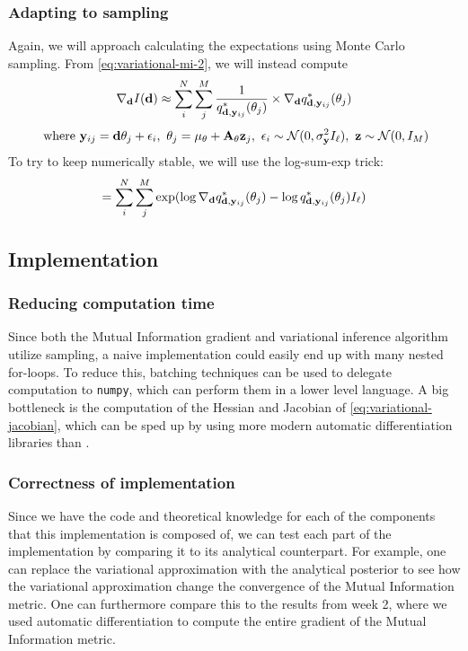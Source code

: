 \subsubsection{Adapting to sampling}
Again, we will approach calculating the expectations using Monte Carlo sampling. From \eqref{eq:variational-mi-2}, we will instead compute
\begin{equation}\nabla_{\mathbf{d}} I(\mathbf{d}) \approx \sum_{i}^N \sum_{j}^M \frac{1}{q^*_{\mathbf{d}, \mathbf{y}_{ij}}(\theta_{j})}\times \nabla_{\mathbf{d}}q^*_{\mathbf{d}, \mathbf{y}_{ij}}(\theta_{j})\end{equation}
$$\ \textrm{where}\ \B{y}_{ij} = \B{d}\theta_j + \epsilon_i,\ \theta_j = \mu_\theta + \B{A}_\theta\B{z}_j,\ \epsilon_i \sim \mathcal{N}(0, \sigma^2_\B{y} I_\ell),\ \B{z} \sim \mathcal{N}(0, I_M)$$
To try to keep numerically stable, we will use the log-sum-exp trick:
\begin{equation}= \sum_{i}^N \sum_{j}^M \exp (\log \nabla_{\mathbf{d}}q^*_{\mathbf{d}, \mathbf{y}_{ij}}(\theta_{j})- \log q^*_{\mathbf{d}, \mathbf{y}_{ij}}(\theta_{j})I_\ell) \label{eq:sample-mi-var}\end{equation}

\subsection{Implementation}
\subsubsection{Reducing computation time}
Since both the Mutual Information gradient and variational inference algorithm utilize sampling, a naive implementation could easily end up with many nested for-loops.
To reduce this, batching techniques can be used to delegate computation to \texttt{numpy}, which can perform them in a lower level language. 
A big bottleneck is the computation of the Hessian and Jacobian of \eqref{eq:variational-jacobian}, which can be sped up by using more modern automatic differentiation libraries than .
\subsubsection{Correctness of implementation}
Since we have the code and theoretical knowledge for each of the components that this implementation is composed of, 
we can test each part of the implementation by comparing it to its analytical counterpart. 
For example, one can replace the variational approximation with the analytical posterior to see how the variational approximation change the convergence of the Mutual Information metric.
One can furthermore compare this to the results from week 2, where we used automatic differentiation to compute the entire gradient of the Mutual Information metric.
